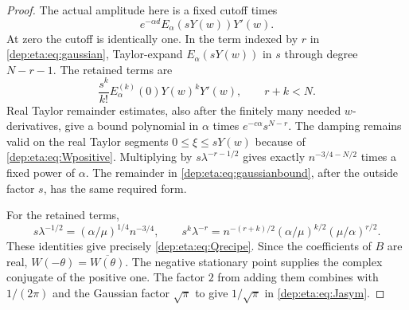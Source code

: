 \documentclass[11pt]{article}
\theoremstyle{definition}\newtheorem{definition}[theorem]{Definition}
\theoremstyle{remark}\newtheorem{remark}[theorem]{Remark}
\begin{document}
\begin{proof}
The actual amplitude here is a fixed cutoff times
\[
 e^{-\alpha d}E_\alpha(sY(w))Y'(w).
\]
At zero the cutoff is identically one. In the term indexed by $r$
in \eqref{dep:eta:eq:gaussian}, Taylor-expand $E_\alpha(sY(w))$ in $s$
through degree $N-r-1$. The retained terms are
\[
 \frac{s^k}{k!}E_\alpha^{(k)}(0)Y(w)^kY'(w),\qquad r+k<N.
\]
Real Taylor remainder estimates, also after the finitely many needed
$w$-derivatives, give a bound polynomial in $\alpha$ times
$e^{-c\alpha}s^{N-r}$. The damping remains valid on the real
Taylor segments $0\le\xi\le sY(w)$ because of
\eqref{dep:eta:eq:Wpositive}. Multiplying by
$s\lambda^{-r-1/2}$ gives exactly
$n^{-3/4-N/2}$ times a fixed power of $\alpha$.
The remainder in \eqref{dep:eta:eq:gaussianbound}, after the outside factor
$s$, has the same required form.

For the retained terms,
\[
 s\lambda^{-1/2}=(\alpha/\mu)^{1/4}n^{-3/4},\qquad
 s^k\lambda^{-r}
 =n^{-(r+k)/2}(\alpha/\mu)^{k/2}(\mu/\alpha)^{r/2}.
\]
These identities give precisely \eqref{dep:eta:eq:Qrecipe}. Since the
coefficients of $B$ are real, $W(-\theta)=\overline{W(\theta)}$.
The negative stationary point supplies the complex conjugate of the
positive one. The factor $2$ from adding them combines with
$1/(2\pi)$ and the Gaussian factor $\sqrt\pi$ to give
$1/\sqrt\pi$ in \eqref{dep:eta:eq:Jasym}.


\end{proof}
\end{document}
